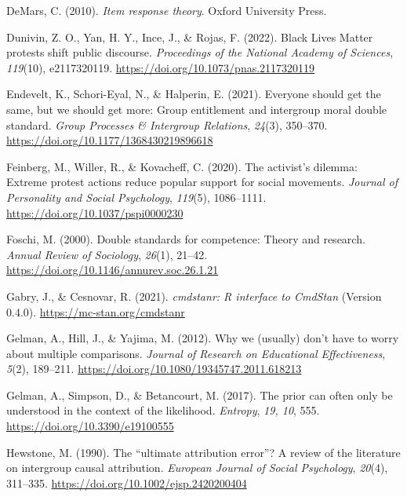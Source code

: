 \documentclass[twocolumn, 11pt, letterpaper]{article}
\newenvironment{CSLReferences}[2]{}{}
\begin{document}
\begin{CSLReferences}{1}{0}
\leavevmode{}%
DeMars, C. (2010). \emph{Item response theory}. Oxford University Press.

\leavevmode{}%
Dunivin, Z. O., Yan, H. Y., Ince, J., \& Rojas, F. (2022). Black {Lives}
{Matter} protests shift public discourse. \emph{Proceedings of the
National Academy of Sciences}, \emph{119}(10), e2117320119.
\url{https://doi.org/10.1073/pnas.2117320119}

\leavevmode{}%
Endevelt, K., Schori-Eyal, N., \& Halperin, E. (2021). Everyone should
get the same, but we should get more: Group entitlement and intergroup
moral double standard. \emph{Group Processes \& Intergroup Relations},
\emph{24}(3), 350--370. \url{https://doi.org/10.1177/1368430219896618}

\leavevmode{}%
Feinberg, M., Willer, R., \& Kovacheff, C. (2020). The activist's
dilemma: {Extreme} protest actions reduce popular support for social
movements. \emph{Journal of Personality and Social Psychology},
\emph{119}(5), 1086--1111. \url{https://doi.org/10.1037/pspi0000230}

\leavevmode{}%
Foschi, M. (2000). Double standards for competence: Theory and research.
\emph{Annual Review of Sociology}, \emph{26}(1), 21--42.
\url{https://doi.org/10.1146/annurev.soc.26.1.21}

\leavevmode{}%
Gabry, J., \& Cesnovar, R. (2021). \emph{{cmdstanr}: {R} interface to
{CmdStan}} (Version 0.4.0). \url{https://mc-stan.org/cmdstanr}

\leavevmode{}%
Gelman, A., Hill, J., \& Yajima, M. (2012). Why we (usually) don't have
to worry about multiple comparisons. \emph{Journal of Research on
Educational Effectiveness}, \emph{5}(2), 189--211.
\url{https://doi.org/10.1080/19345747.2011.618213}

\leavevmode{}%
Gelman, A., Simpson, D., \& Betancourt, M. (2017). The prior can often
only be understood in the context of the likelihood. \emph{Entropy},
\emph{19, 10}, 555. \url{https://doi.org/10.3390/e19100555}

\leavevmode{}%
Hewstone, M. (1990). The {``ultimate attribution error''}? {A} review of
the literature on intergroup causal attribution. \emph{European Journal
of Social Psychology}, \emph{20}(4), 311--335.
\url{https://doi.org/10.1002/ejsp.2420200404}


\end{CSLReferences}
\end{document}
